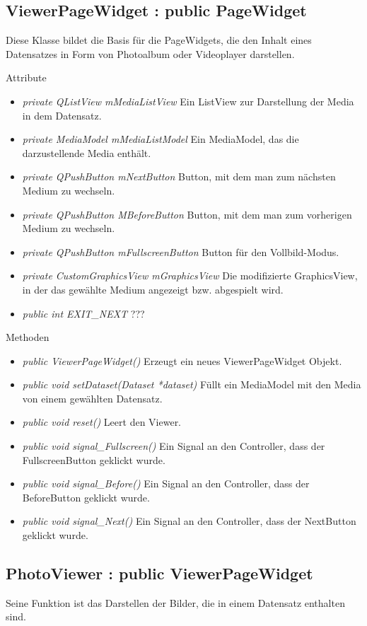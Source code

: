 \subsection*{ViewerPageWidget : public PageWidget}
Diese Klasse bildet die Basis für die PageWidgets, die den Inhalt eines Datensatzes in Form von Photoalbum oder Videoplayer darstellen.

Attribute
\begin{itemize}
	\item\textit{private QListView mMediaListView}
	Ein ListView zur Darstellung der Media in dem Datensatz.
	\item\textit{private MediaModel mMediaListModel} 
	Ein MediaModel, das die darzustellende Media enthält.
	\item\textit{private QPushButton mNextButton}
	Button, mit dem man zum nächsten Medium zu wechseln. 
	\item\textit{private QPushButton MBeforeButton}
	Button, mit dem man zum vorherigen Medium zu wechseln.
	\item\textit{private QPushButton mFullscreenButton}
	Button für den Vollbild-Modus.
	\item\textit{private CustomGraphicsView mGraphicsView} 
	Die modifizierte GraphicsView, in der das gewählte Medium angezeigt bzw. abgespielt wird.  
	\item\textit{public int EXIT\_NEXT} 
	???     
\end{itemize}

Methoden
\begin{itemize}
	\item\textit{public ViewerPageWidget()} 
	Erzeugt ein neues ViewerPageWidget Objekt.
	\item\textit{public void setDataset(Dataset *dataset)} 
	Füllt ein MediaModel mit den Media von einem gewählten Datensatz.
	\item\textit{public void reset()} 
	Leert den Viewer.
	\item\textit{public void signal\_Fullscreen()} 
	Ein Signal an den Controller, dass der FullscreenButton geklickt wurde.
	\item\textit{public void signal\_Before()} 
	Ein Signal an den Controller, dass der BeforeButton geklickt wurde.
	\item\textit{public void signal\_Next()}
	Ein Signal an den Controller, dass der NextButton geklickt wurde.
\end{itemize}

\subsection*{PhotoViewer : public ViewerPageWidget}
Seine Funktion ist das Darstellen der Bilder, die in einem Datensatz enthalten sind.

